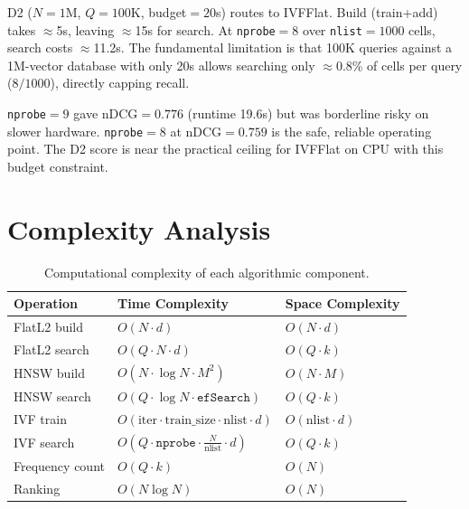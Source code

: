 \documentclass[11pt,a4paper]{article}
\begin{document}
D2 ($N=1$M, $Q=100$K, budget$=20$s) routes to IVFFlat. Build (train+add) takes
$\approx$5s, leaving $\approx$15s for search. At \texttt{nprobe}$=8$ over
\texttt{nlist}$=1000$ cells, search costs $\approx$11.2s. The fundamental
limitation is that 100K queries against a 1M-vector database with only 20s
allows searching only $\approx$0.8\% of cells per query ($8/1000$), directly
capping recall.

\texttt{nprobe}$=9$ gave nDCG$=0.776$ (runtime 19.6s) but was borderline risky
on slower hardware. \texttt{nprobe}$=8$ at nDCG$=0.759$ is the safe, reliable
operating point. The D2 score is near the practical ceiling for IVFFlat on CPU
with this budget constraint.

\section{Complexity Analysis}

\begin{table}[H]
\centering
\renewcommand{\arraystretch}{1.35}
\caption{Computational complexity of each algorithmic component.}
\label{tab:complexity}
\begin{tabular}{p{3.2cm} p{5.5cm} p{4cm}}
\toprule
\rowcolor{tableheader}
\color{white}\textbf{Operation} &
\color{white}\textbf{Time Complexity} &
\color{white}\textbf{Space Complexity} \\
\midrule
\rowcolor{rowA}
FlatL2 build    & $O(N \cdot d)$                                       & $O(N \cdot d)$ \\
\rowcolor{rowB}
FlatL2 search   & $O(Q \cdot N \cdot d)$                               & $O(Q \cdot k)$ \\
\rowcolor{rowA}
HNSW build      & $O(N \cdot \log N \cdot M^2)$                        & $O(N \cdot M)$ \\
\rowcolor{rowB}
HNSW search     & $O(Q \cdot \log N \cdot \texttt{efSearch})$          & $O(Q \cdot k)$ \\
\rowcolor{rowA}
IVF train       & $O(\text{iter} \cdot \text{train\_size} \cdot \text{nlist} \cdot d)$ & $O(\text{nlist} \cdot d)$ \\
\rowcolor{rowB}
IVF search      & $O\!\left(Q \cdot \texttt{nprobe} \cdot \tfrac{N}{\text{nlist}} \cdot d\right)$ & $O(Q \cdot k)$ \\
\rowcolor{rowA}
Frequency count & $O(Q \cdot k)$                                       & $O(N)$ \\
\rowcolor{rowB}
Ranking         & $O(N \log N)$                                        & $O(N)$ \\
\bottomrule
\end{tabular}
\end{table}
\end{document}

